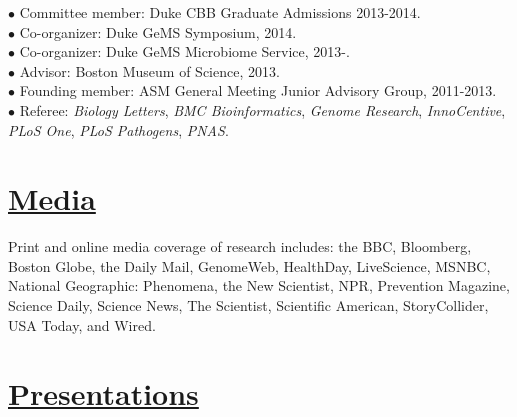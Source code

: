 \documentclass[overlapped,line,11pt]{res}
\begin{document}
\begin{resume}
\vspace{-10mm}
\hangindent=0.5in $\bullet$\hspace{.1in} Committee member: Duke CBB Graduate Admissions 2013-2014. \\

\vspace{-10mm}
\hangindent=0.5in $\bullet$\hspace{.1in} Co-organizer: Duke GeMS
Symposium, 2014. \\

\vspace{-10mm}
\hangindent=0.5in $\bullet$\hspace{.1in} Co-organizer: Duke GeMS
Microbiome Service, 2013-. \\

\vspace{-10mm}
\hangindent=0.5in $\bullet$\hspace{.1in} Advisor: Boston Museum of
Science, 2013. \\

\vspace{-10mm}
\hangindent=0.5in $\bullet$\hspace{.1in} Founding member: ASM General Meeting
Junior Advisory Group, 2011-2013. \\

\vspace{-10mm} \hangindent=0.5in $\bullet$\hspace{.1in} Referee:
\emph{Biology Letters}, \emph{BMC Bioinformatics}, \emph{Genome
  Research}, \emph{InnoCentive}, \emph{PLoS One}, \emph{PLoS Pathogens}, \emph{PNAS}.


\section{\underline{\sc Media}} 
\vspace{.05in} Print and online media coverage of research includes:
the BBC, Bloomberg, Boston Globe, the Daily Mail, GenomeWeb,
HealthDay, LiveScience, MSNBC, National Geographic: Phenomena, the New
Scientist, NPR, Prevention Magazine, Science Daily, Science News, The
Scientist, Scientific American, StoryCollider, USA Today, and Wired.

\section{\underline{\sc Presentations}}
\vspace{.25in}


\end{resume}
\end{document}
